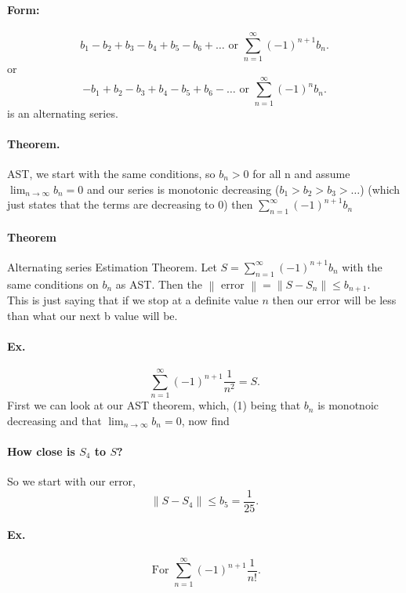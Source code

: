 \paragraph{Form:}
\[
b_1 - b_2 + b_3 - b_4 + b_5 - b_6 + \ldots \text{ or }\sum_{ n=1 } ^{ \infty } \left( -1 \right) ^{ n+1 }b_n
.\] 
or
\[
-b_1 + b_2 - b_3 + b_4 - b_5 + b_6 - \ldots \text{ or }\sum_{ n=1 } ^{ \infty } \left( -1 \right) ^{ n }b_n
.\] 
is an alternating series.

\paragraph{Theorem.} AST, we start with the same conditions, so $ b_n > 0 $ for all n and assume $ \lim_{ n \to \infty} b_n=0 $ and our series is monotonic decreasing ($ b_1 > b_2 > b_3 > \ldots $) (which just states  that the terms are decreasing to 0) then $ \sum_{ n=1 } ^{ \infty } \left( -1 \right)^{ n+1 }b_n  $

\paragraph{Theorem} Alternating series Estimation Theorem. Let $ S=\sum_{ n=1 } ^{ \infty } \left( -1 \right) ^{ n+1 }b_n $ with the same conditions on $ b_n $ as AST. Then the $ \left\| \text{ error } \right\|=\left\| S-S_n \right\| \le b_{ n+1 } $. \\
\label{par:Theorem}
This is just saying that if we stop at a definite value $ n $ then our error will be less than what our next b value will be. 

\paragraph{Ex.}
\[
\sum_{ n=1 } ^{ \infty } \left( -1 \right) ^{ n+1 }\frac{ 1 }{ n^2 } =S
.\] 
First we can look at our AST theorem, which, (1) being that $ b_n $ is monotnoic decreasing and that $ \lim_{ n \to \infty} b_n = 0 $, now find 
\paragraph{How close is $ S_4 $ to $ S $?\\}
So we start with our error, 
\[
\left\| S-S_{ 4 } \right\|\le b_5 = \frac{ 1 }{ 25 } 
.\] 

\paragraph{Ex.}
\[
\text{ For }\sum_{ n=1 } ^{ \infty } \left( -1 \right) ^{ n+1 }\frac{ 1 }{ n! } 
.\] 
